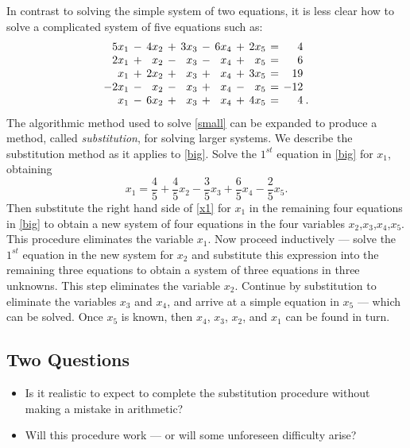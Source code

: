 \documentclass{ximera}
\begin{document}
In contrast to solving the simple system of two equations,
it is less clear how to solve a complicated system of five
equations such as:
\begin{equation}    \label{big}
\arraycolsep 2pt
\begin{array}{rcrcrcrcrcrl}
 5x_1 & - & 4x_2 & + & 3x_3 & - & 6x_4 & + & 2x_5 & = &   4  & \\
 2x_1 & + &  x_2 & - &  x_3 & - &  x_4 & + &  x_5 & = &   6  & \\
  x_1 & + & 2x_2 & + &  x_3 & + &  x_4 & + & 3x_5 & = &  19  & \\
-2x_1 & - &  x_2 & - &  x_3 & + &  x_4 & - &  x_5 & = & -12  & \\
  x_1 & - & 6x_2 & + &  x_3 & + &  x_4 & + & 4x_5 & = &   4  & \!
.
\end{array}
\end{equation}
The algorithmic method used to solve \eqref{small} can be expanded
to produce a method, called {\em substitution\/},
 for solving larger systems. We describe the
substitution method as it applies to \eqref{big}.  Solve the
$1^{st}$ equation in \eqref{big} for $x_1$, obtaining
\begin{equation} \label{x1}
x_1 = \frac{4}{5}  + \frac{4}{5}x_2 - \frac{3}{5}x_3
   + \frac{6}{5}x_4 - \frac{2}{5}x_5.
\end{equation}
Then substitute the right hand side of \eqref{x1} for $x_1$ in the
remaining four equations in \eqref{big} to obtain a new system of
four equations in the four variables $x_2$,$x_3$,$x_4$,$x_5$.
This procedure eliminates the variable $x_1$.  Now proceed
inductively --- solve the $1^{st}$ equation in the new system
for $x_2$ and substitute this expression into the remaining
three equations to obtain a system of three equations in three
unknowns.  This step eliminates the variable $x_2$.  Continue by
substitution to eliminate the variables $x_3$ and $x_4$, and
arrive at a simple equation in $x_5$ --- which can be solved.
Once $x_5$ is known, then $x_4$, $x_3$, $x_2$, and $x_1$ can be
found in turn.

\subsection*{Two Questions}

\begin{itemize}
\item Is it realistic to expect to complete the substitution
procedure without making a mistake in arithmetic?
\item Will this procedure work --- or will some unforeseen
difficulty arise?
\end{itemize}
\end{document}
